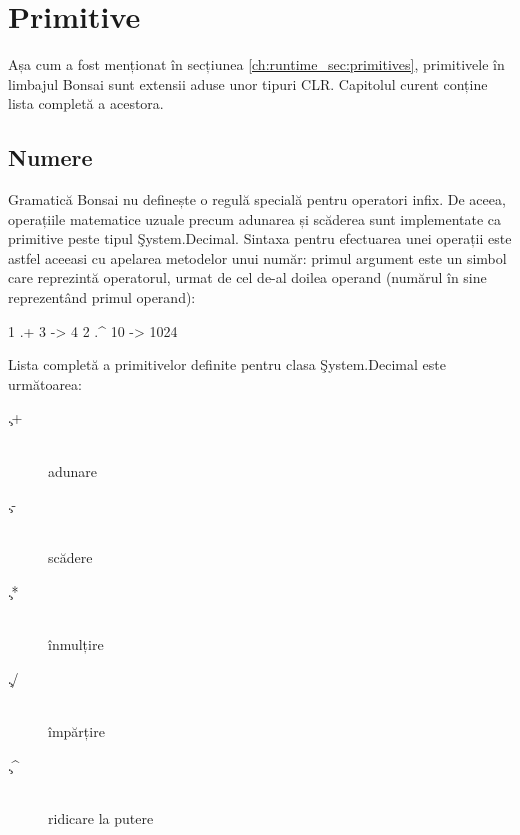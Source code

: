 \documentclass[12pt,a4paper]{memoir}
\begin{document}
\chapter{Primitive}\label{ch:Primitives}

Așa cum a fost menționat în secțiunea \ref{ch:runtime_sec:primitives}, primitivele în limbajul Bonsai sunt extensii aduse unor tipuri CLR. Capitolul curent conține lista completă a acestora.

\section{Numere}

Gramatică Bonsai nu definește o regulă specială pentru operatori infix. De aceea, operațiile matematice uzuale precum adunarea și scăderea sunt implementate ca primitive peste tipul \c{System.Decimal}. Sintaxa pentru efectuarea unei operații este astfel aceeasi cu apelarea metodelor unui număr: primul argument este un simbol care reprezintă operatorul, urmat de cel de-al doilea operand (numărul în sine reprezentând primul operand):
\begin{code}
1 .+ 3 
  -> 4
2 .^ 10
  -> 1024
\end{code}

Lista completă a primitivelor definite pentru clasa \c{System.Decimal} este următoarea:

\begin{description}
\item[\c{.+}]\hfill\\ adunare
\item[\c{.-}]\hfill\\ scădere
\item[\c{.*}]\hfill\\ înmulțire
\item[\c{./}]\hfill\\ împărțire
\item[\c{.\textasciicircum}]\hfill\\ ridicare la putere
\end{description}
\end{document}
